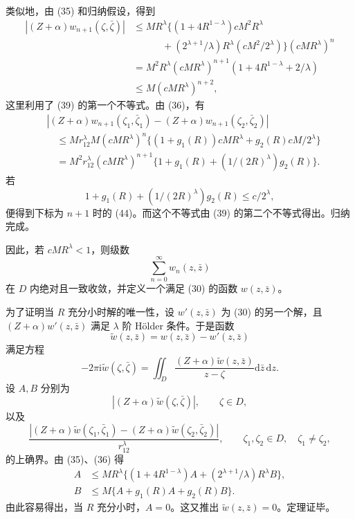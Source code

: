 \documentclass[UTF8,a4paper,11pt,fontset=fandol]{ctexart}
\newcommand{\dd}{\mathrm d}
\newcommand{\ii}{\mathrm i}
\newcommand{\dz}{\dd\bar z\,\dd z}
\newcommand{\zz}{\bar\zeta}
\begin{document}
类似地，由 (35) 和归纳假设，得到
\begin{align*}
|(Z+\alpha)w_{n+1}(\zeta,\zz)|
&\le MR^\lambda\{(1+4R^{1-\lambda})cM^2R^\lambda\\
&\qquad\quad+(2^{\lambda+1}/\lambda)R^\lambda(cM^2/2^\lambda)\}(cMR^\lambda)^n\\
&=M^2R^\lambda(cMR^\lambda)^{n+1}(1+4R^{1-\lambda}+2/\lambda)\\
&\le M(cMR^\lambda)^{n+2},
\end{align*}
这里利用了 (39) 的第一个不等式。由 (36)，有
\begin{align*}
&|(Z+\alpha)w_{n+1}(\zeta_1,\bar\zeta_1)-(Z+\alpha)w_{n+1}(\zeta_2,\bar\zeta_2)|\\
&\quad\le Mr_{12}^\lambda M(cMR^\lambda)^n
\{(1+g_1(R))cMR^\lambda+g_2(R)cM/2^\lambda\}\\
&\quad=M^2r_{12}^\lambda(cMR^\lambda)^{n+1}
\{1+g_1(R)+(1/(2R)^\lambda)g_2(R)\}.
\end{align*}
若
\[1+g_1(R)+(1/(2R)^\lambda)g_2(R)\le c/2^\lambda,\]
便得到下标为 $n+1$ 时的 (44)。而这个不等式由 (39) 的第二个不等式得出。归纳完成。

因此，若 $cMR^\lambda<1$，则级数
\begin{equation}\sum_{n=0}^{\infty}w_n(z,\bar z)\tag{45}\end{equation}
在 $D$ 内绝对且一致收敛，并定义一个满足 (30) 的函数 $w(z,\bar z)$。

为了证明当 $R$ 充分小时解的唯一性，设 $w'(z,\bar z)$ 为 (30) 的另一个解，且 $(Z+\alpha)w'(z,\bar z)$ 满足 $\lambda$ 阶 Hölder 条件。于是函数
\[\widetilde w(z,\bar z)=w(z,\bar z)-w'(z,\bar z)\]
满足方程
\[-2\pi\ii\widetilde w(\zeta,\zz)=\iint_D\frac{(Z+\alpha)\widetilde w(z,\bar z)}{z-\zeta}\dz.\]
设 $A,B$ 分别为
\[|(Z+\alpha)\widetilde w(\zeta,\zz)|,\qquad\zeta\in D,\]
以及
\[\frac{|(Z+\alpha)\widetilde w(\zeta_1,\bar\zeta_1)-(Z+\alpha)\widetilde w(\zeta_2,\bar\zeta_2)|}{r_{12}^\lambda},\qquad\zeta_1,\zeta_2\in D,\quad\zeta_1\ne\zeta_2,\]
的上确界。由 (35)、(36) 得
\begin{align*}
A&\le MR^\lambda\{(1+4R^{1-\lambda})A+(2^{\lambda+1}/\lambda)R^\lambda B\},\\
B&\le M\{A+g_1(R)A+g_2(R)B\}.
\end{align*}
由此容易得出，当 $R$ 充分小时，$A=0$。这又推出 $\widetilde w(z,\bar z)=0$。定理证毕。
\end{document}
